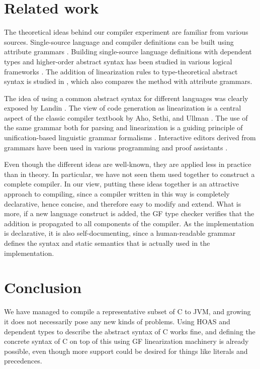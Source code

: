 \documentclass[12pt]{article}
\begin{document}
\section{Related work}

The theoretical ideas behind our compiler experiment
are familiar from various sources.
Single-source language and compiler definitions
can be built using attribute grammars \cite{knuth-attr}.
Building single-source language definitions with
dependent types and higher-order abstract syntax
has been studied in various logical frameworks 
\cite{harper-honsell,magnusson-nordstr,twelf}.
The addition of linearization rules to
type-theoretical abstract syntax is studied in
\cite{semBNF}, which also compares the method with
attribute grammars.

The idea of using a common abstract syntax for different 
languages was clearly exposed by Landin \cite{landin}. The view of
code generation as linearization is a central aspect of
the classic compiler textbook by Aho, Sethi, and Ullman
\cite{aho-ullman}. 
The use of the same grammar both for parsing and linearization
is a guiding principle of unification-based linguistic grammar 
formalisms \cite{pereira-shieber}. Interactive editors derived from
grammars have been used in various programming and proof
assistants \cite{teitelbaum,metal,magnusson-nordstr}.

Even though the different ideas are well-known, they are
applied less in practice than in theory. In particular,
we have not seen them used together to construct a complete
compiler. In our view, putting these ideas together is
an attractive approach to compiling, since a compiler written
in this way is completely declarative, hence concise, 
and therefore easy to modify and extend. What is more, if
a new language construct is added, the GF type checker
verifies that the addition is propagated to all components
of the compiler. As the implementation is declarative, 
it is also self-documenting, since a human-readable 
grammar defines the syntax and static
semantics that is actually used in the implementation.


\section{Conclusion}

We have managed to compile a representative 
subset of C to JVM, and growing it
does not necessarily pose any new kinds of problems. 
Using HOAS and dependent types to describe the abstract
syntax of C works fine, and defining the concrete syntax
of C on top of this using GF linearization machinery is 
already possible, even though more support could be
desired for things like literals and precedences.
\end{document}
